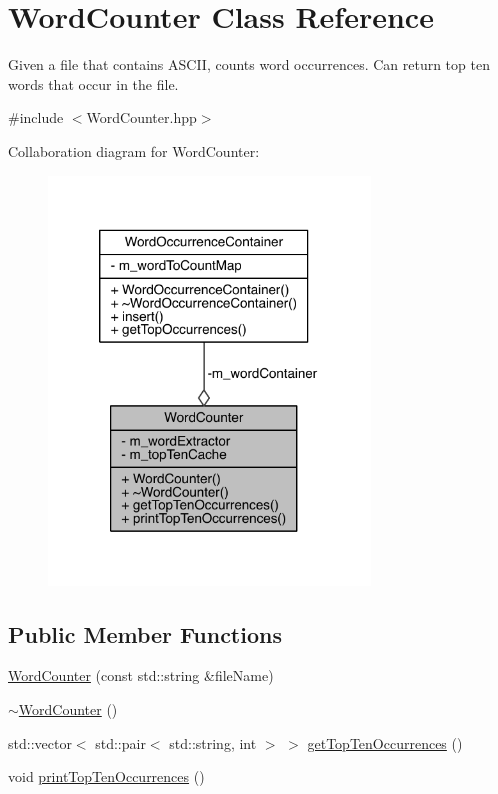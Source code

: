 \hypertarget{class_word_counter}{}\section{Word\+Counter Class Reference}
\label{class_word_counter}


Given a file that contains A\+S\+C\+II, counts word occurrences. Can return top ten words that occur in the file.  




{\ttfamily \#include $<$Word\+Counter.\+hpp$>$}



Collaboration diagram for Word\+Counter\+:\nopagebreak
\begin{figure}[H]
\begin{center}
\leavevmode
\includegraphics[width=242pt]{class_word_counter__coll__graph}
\end{center}
\end{figure}
\subsection*{Public Member Functions}
\begin{DoxyCompactItemize}
\item 
\mbox{\hyperlink{class_word_counter_affea0f9dd574ac25eb447a161b4e9c22}{Word\+Counter}} (const std\+::string \&file\+Name)
\item 
\mbox{\hyperlink{class_word_counter_ad0703060b084d90e36bb7b506c7eff94}{$\sim$\+Word\+Counter}} ()
\item 
std\+::vector$<$ std\+::pair$<$ std\+::string, int $>$ $>$ \mbox{\hyperlink{class_word_counter_ab1c63e4767c0ac7d4c884f0ed78cac26}{get\+Top\+Ten\+Occurrences}} ()
\item 
void \mbox{\hyperlink{class_word_counter_a29d681756dec9d102141c6c8a136561d}{print\+Top\+Ten\+Occurrences}} ()
\end{DoxyCompactItemize}
